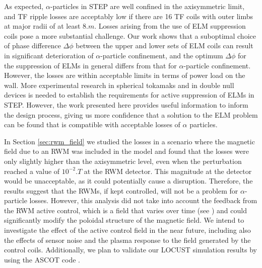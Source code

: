\documentclass[10pt, a4paper, twoside]{article}
\begin{document}
As expected, $\alpha$-particles in STEP are well confined in the axisymmetric limit, and TF ripple losses are acceptably low if there are 16 TF coils with outer limbs at major radii of at least $\si{8.m}$. Losses arising from the use of ELM suppression coils pose a more substantial challenge. Our work shows that a suboptimal choice of phase difference $\Delta\phi$ between the upper and lower sets of ELM coils can result in significant deterioration of $\alpha$-particle confinement, and the optimum $\Delta\phi$ for the suppression of ELMs in general differs from that for $\alpha$-particle confinement. However, the losses are within acceptable limits in terms of power load on the wall. More experimental research in spherical tokamaks and in double null devices is needed to establish the requirements for active suppression of ELMs in STEP. However, the work presented here provides useful information to inform the design process, giving us more confidence that a solution to the ELM problem can be found that is compatible with acceptable losses of $\alpha$ particles.

In Section \ref{sec:rwm_field} we studied the losses in a scenario where the magnetic field due to an RWM was included in the model and found that the losses were only slightly higher than the axisymmetric level, even when the perturbation reached a value of $\si{10^{-2}.T}$ at the RWM detector. This magnitude at the detector would be unacceptable, as it could potentially cause a disruption. Therefore, the results suggest that the RWMs, if kept controlled, will not be a problem for $\alpha$-particle losses. However, this analysis did not take into account the feedback from the RWM active control, which is a field that varies over time (see \cite{xia2023}) and could significantly modify the poloidal structure of the magnetic field. We intend to investigate the effect of the active control field in the near future, including also the effects of sensor noise and the plasma response to the field generated by the control coils. Additionally, we plan to validate our LOCUST simulation results by using the ASCOT code \cite{hirvijoki2014}.

\end{document}
